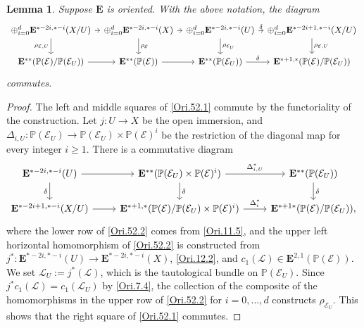 \documentclass[11pt, a4paper]{amsart}
\newtheorem{lem}[thm]{Lemma}
\theoremstyle{definition}
\numberwithin{equation}{subsection}
\renewcommand{\P}{\mathbb{P}}
\newcommand{\cE}{\mathcal{E}}
\newcommand{\cL}{\mathcal{L}}
\newcommand{\ringE}{\mathbf{E}}
\begin{document}
\begin{lem}
\label{Ori.52}
Suppose $\ringE$ is oriented.
With the above notation, the diagram
\begin{equation}
\label{Ori.52.1}
\begin{tikzcd}[column sep=tiny]
\oplus_{i=0}^d \ringE^{*-2i,*-i}(X/U)\ar[r]\ar[d,"\rho_{\cE,U}"']&
\oplus_{i=0}^d \ringE^{*-2i,*-i}(X)\ar[r]\ar[d,"\rho_{\cE}"]&
\oplus_{i=0}^d \ringE^{*-2i,*-i}(U)\ar[r,"\delta"]\ar[d,"\rho_{\cE_U}"]&
\oplus_{i=0}^d \ringE^{*-2i+1,*-i}(X/U)\ar[d,"\rho_{\cE,U}"]
\\
\ringE^{**}(\P(\cE)/\P(\cE_U))\ar[r]&
\ringE^{**}(\P(\cE))\ar[r]&
\ringE^{**}(\P(\cE_U))\ar[r,"\delta"]&
\ringE^{*+1,*}(\P(\cE)/\P(\cE_U))
\end{tikzcd}
\end{equation}
commutes.
\end{lem}
\begin{proof}
The left and middle squares of \eqref{Ori.52.1} commute by the functoriality of the construction.
Let $j\colon U\to X$ be the open immersion, and $\Delta_{i,U}\colon \P(\cE_U)\to \P(\cE_U)\times \P(\cE)^i$ be the restriction of the diagonal map for every integer $i\geq 1$.
There is a commutative diagram
\begin{equation}
\label{Ori.52.2}
\begin{tikzcd}
\ringE^{*-2i,*-i}(U)\ar[d,"\delta"']\ar[r]&
\ringE^{**}(\P(\cE_U)\times \P(\cE)^i)\ar[r,"\Delta_{i,U}^*"]\ar[d,"\delta"]&
\ringE^{**}(\P(\cE_U))\ar[d,"\delta"]
\\
\ringE^{*-2i+1,*-i}(X/U)\ar[r]&
\ringE^{*+1,*}(\P(\cE)/\P(\cE_U)\times \P(\cE)^i)\ar[r,"\Delta_i^*"]&
\ringE^{*+1*}(\P(\cE)/\P(\cE_U)),
\end{tikzcd}
\end{equation}
where the lower row of \eqref{Ori.52.2} comes from \eqref{Ori.11.5}, and the upper left horizontal homomorphism of \eqref{Ori.52.2} is constructed from $j^*\colon \ringE^{*-2i,*-i}(U)\to \ringE^{*-2i,*-i}(X)$, \eqref{Ori.12.2}, and $c_1(\cL)\in \ringE^{2,1}(\P(\cE))$.
We set $\cL_U:=j^*(\cL)$, which is the tautological bundle on $\P(\cE_U)$.
Since $j^*c_1(\cL)=c_1(\cL_U)$ by \eqref{Ori.7.4},
the collection of the composite of the homomorphisms in the upper row of \eqref{Ori.52.2} for $i=0,\ldots,d$ constructs $\rho_{\cE_U}$.
This shows that the right square of \eqref{Ori.52.1} commutes.
\end{proof}
\end{document}
